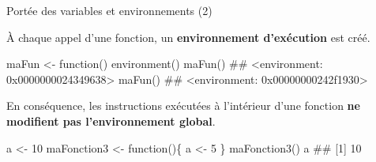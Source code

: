 \documentclass[12pt,ignorenonframetext,handout,]{beamer}
\newenvironment{Shaded}{}{}
\newcommand{\ControlFlowTok}[1]{\textcolor[rgb]{0.00,0.00,1.00}{#1}}
\newcommand{\DecValTok}[1]{#1}
\newcommand{\KeywordTok}[1]{\textcolor[rgb]{0.00,0.00,1.00}{#1}}
\newcommand{\NormalTok}[1]{#1}
\newcommand{\StringTok}[1]{\textcolor[rgb]{0.00,0.50,0.50}{#1}}
\renewenvironment{Shaded}{\begin{snugshade}}{\end{snugshade}}
\begin{document}
\begin{frame}[fragile]{\large Portée des variables et environnements
(2)}
\protect\hypertarget{portee-des-variables-et-environnements-2}{}

\small

À chaque appel d’une fonction, un \textbf{environnement d’exécution} est
créé.

\footnotesize

\begin{Shaded}
\begin{Highlighting}[]
\NormalTok{maFun <-}\StringTok{ }\ControlFlowTok{function}\NormalTok{() }\KeywordTok{environment}\NormalTok{()}
\KeywordTok{maFun}\NormalTok{()}
\NormalTok{  ## <environment: 0x0000000024349638>}
\KeywordTok{maFun}\NormalTok{()}
\NormalTok{  ## <environment: 0x00000000242f1930>}
\end{Highlighting}
\end{Shaded}

\pause \small

En conséquence, les instructions exécutées à l’intérieur d’une fonction
\textbf{ne modifient pas l’environnement global}.

\footnotesize

\begin{Shaded}
\begin{Highlighting}[]
\NormalTok{a <-}\StringTok{ }\DecValTok{10}
\NormalTok{maFonction3 <-}\StringTok{ }\ControlFlowTok{function}\NormalTok{()\{}
\NormalTok{  a <-}\StringTok{ }\DecValTok{5}
\NormalTok{\}}
\KeywordTok{maFonction3}\NormalTok{()}
\NormalTok{a}
\NormalTok{  ## [1] 10}
\end{Highlighting}
\end{Shaded}

\end{frame}
\end{document}
